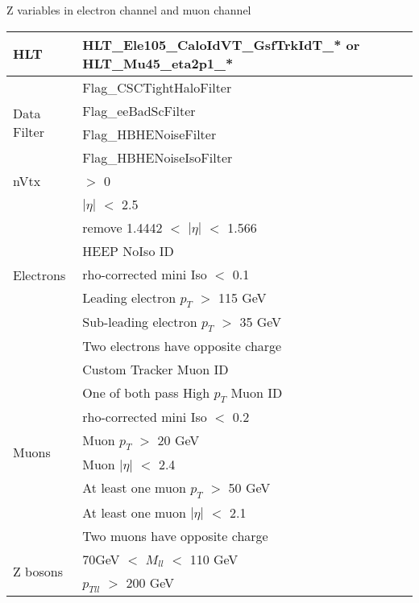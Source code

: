 \documentclass[7pt,aspectratio=1610]{beamer}
\begin{document}
\begin{frame}
  \justifying
  \LARGE{Z variables in electron channel and muon channel}
  \begin{tiny}
    \begin{center}
      \begin{tabular}[t]{ | l | l | }
        \hline
        HLT       
        & HLT\_Ele105\_CaloIdVT\_GsfTrkIdT\_* or HLT\_Mu45\_eta2p1\_*  \\
        \hline
        \multirow{4}{*}{Data Filter}
        & Flag\_CSCTightHaloFilter                  \\ 
        & Flag\_eeBadScFilter                       \\
        & Flag\_HBHENoiseFilter                     \\
        & Flag\_HBHENoiseIsoFilter                  \\
        \hline
        nVtx 
        & $>$ 0                                    \\
        \hline
        \multirow{7}{*}{Electrons} 
        & $|\eta|$ $<$ 2.5                          \\
        & remove 1.4442 $<$ $|\eta|$ $<$ 1.566      \\
        & HEEP NoIso ID                             \\
        & rho-corrected mini Iso $<$ 0.1            \\
        & Leading electron $p_T$ $>$ 115 GeV        \\
        & Sub-leading electron $p_T$ $>$ 35 GeV     \\
        & Two electrons have opposite charge        \\
        \hline
        \multirow{8}{*}{Muons}
        & Custom Tracker Muon ID                    \\ 
        & One of both pass High $p_T$ Muon ID       \\
        & rho-corrected mini Iso $<$ 0.2            \\
        & Muon $p_T$ $>$ 20 GeV                     \\
        & Muon $|\eta|$ $<$ 2.4                     \\
        & At least one muon $p_T$ $>$ 50 GeV        \\
        & At least one muon $|\eta|$ $<$ 2.1        \\ 
        & Two muons have opposite charge            \\
        \hline
        \multirow{2}{*}{Z bosons}
        & 70GeV $<$ $M_{ll}$ $<$ 110 GeV            \\
        & $p_{Tll}$ $>$ 200 GeV                     \\
        \hline
      \end{tabular}
    \end{center}   
  \end{tiny}
\end{frame}
\end{document}
